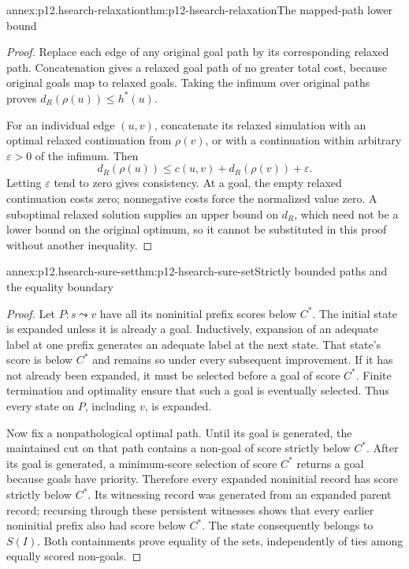 \begin{annexitem}{annex:p12.hsearch-relaxation}{thm:p12-hsearch-relaxation}{The mapped-path lower bound}
\begin{proof}
Replace each edge of any original goal path by its corresponding relaxed
path. Concatenation gives a relaxed goal path of no greater total cost,
because original goals map to relaxed goals. Taking the infimum over
original paths proves \(d_R(\rho(u))\le h^*(u)\).

For an individual edge \((u,v)\), concatenate its relaxed simulation
with an optimal relaxed continuation from \(\rho(v)\), or with a
continuation within arbitrary \(\varepsilon>0\) of the infimum.
Then
\[
 d_R(\rho(u))\le c(u,v)+d_R(\rho(v))+\varepsilon.
\]
Letting \(\varepsilon\) tend to zero gives consistency. At a goal,
the empty relaxed continuation costs zero; nonnegative costs force the
normalized value zero. A suboptimal relaxed solution supplies an upper
bound on \(d_R\), which need not be a lower bound on the original
optimum, so it cannot be substituted in this proof without another
inequality.
\end{proof}
\end{annexitem}

\begin{annexitem}{annex:p12.hsearch-sure-set}{thm:p12-hsearch-sure-set}{Strictly bounded paths and the equality boundary}
\begin{proof}
Let \(P:s\leadsto v\) have all its noninitial prefix scores below
\(C^*\). The initial state is expanded unless it is already a goal.
Inductively, expansion of an adequate label at one prefix generates an
adequate label at the next state. That state's score is below \(C^*\)
and remains so under every subsequent improvement. If it has not already
been expanded, it must be selected before a goal of score \(C^*\).
Finite termination and optimality ensure that such a goal is eventually
selected. Thus every state on \(P\), including \(v\), is expanded.

Now fix a nonpathological optimal path. Until its goal is generated,
the maintained cut on that path contains a non-goal of score strictly
below \(C^*\). After its goal is generated, a minimum-score selection
of score \(C^*\) returns a goal because goals have priority. Therefore
every expanded noninitial record has score strictly below \(C^*\).
Its witnessing record was generated from an expanded parent record;
recursing through these persistent witnesses shows that every earlier
noninitial prefix also had score below \(C^*\). The state consequently
belongs to \(S(I)\). Both containments prove equality of the sets,
independently of ties among equally scored non-goals.
\end{proof}
\end{annexitem}

